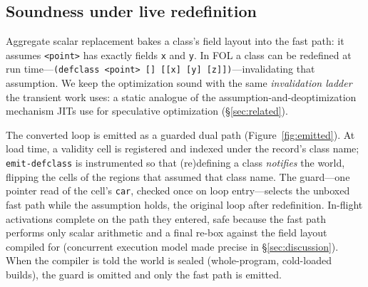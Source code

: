 \documentclass[sigplan,screen,review,anonymous]{acmart}
\begin{document}
\subsection{Soundness under live redefinition}
\label{sec:world}

Aggregate scalar replacement bakes a class's field layout into the fast path: it
assumes \texttt{<point>} has exactly fields \texttt{x} and \texttt{y}. In FOL a
class can be redefined at run time---\texttt{(defclass <point> [] [[x] [y]
[z]])}---invalidating that assumption. We keep the optimization sound with
the same \emph{invalidation ladder} the transient work uses: a static
analogue of the assumption-and-deoptimization mechanism JITs
use for speculative optimization (\S\ref{sec:related}).

The converted loop is emitted as a guarded dual path (Figure~\ref{fig:emitted}).
At load time, a validity cell is registered and indexed under the record's
class name; \texttt{emit-defclass} is instrumented so that (re)defining a
class \emph{notifies} the world, flipping the cells of the regions
that assumed that class name. The guard---one pointer read of the cell's
\texttt{car}, checked once on loop entry---selects the unboxed fast path
while the assumption holds, the original loop after redefinition.
In-flight activations complete on the path they
entered, safe because the fast path performs only scalar arithmetic and
a final re-box against the field layout compiled for (concurrent
execution model made precise in \S\ref{sec:discussion}). When the compiler
is told the world is sealed (whole-program, cold-loaded builds), the guard
is omitted and only the fast path is emitted.
\end{document}
